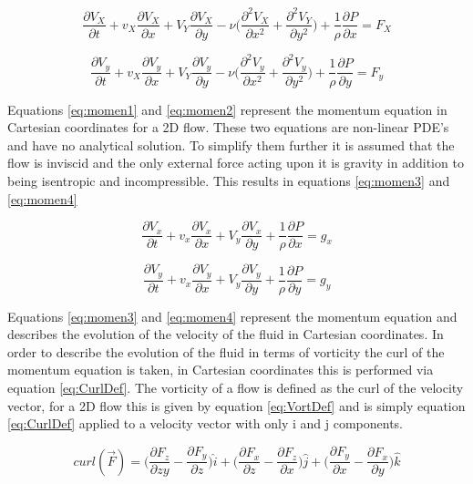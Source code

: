 \begin{equation}
\label{eq:momen1}
\frac{\partial V_X}{\partial t}+v_X \frac{\partial V_X}{\partial x}+V_Y \frac{\partial V_X}{\partial y}-\nu\big(\frac{\partial^2 V_X}{\partial x^2}+\frac{\partial^2 V_Y}{\partial y^2}\big)+\frac{1}{\rho}\frac{\partial P}{\partial x}=F_X
\end{equation}

\begin{equation}
\label{eq:momen2}
\frac{\partial V_y}{\partial t}+v_X \frac{\partial V_y}{\partial x}+V_Y \frac{\partial V_y}{\partial y}-\nu\big(\frac{\partial^2 V_y}{\partial x^2}+\frac{\partial^2 V_y}{\partial y^2}\big)+\frac{1}{\rho}\frac{\partial P}{\partial y}=F_y
\end{equation}

Equations \ref{eq:momen1} and \ref{eq:momen2} represent the momentum equation in Cartesian coordinates for a 2D flow. These two equations are non-linear PDE's and have no analytical solution. To simplify them further it is assumed that the flow is inviscid and the only external force acting upon it is gravity in addition to being isentropic and incompressible. This results in equations \ref{eq:momen3} and \ref{eq:momen4}

\begin{equation}
\label{eq:momen3}
\frac{\partial V_x}{\partial t}+v_x \frac{\partial V_x}{\partial x}+V_y \frac{\partial V_x}{\partial y}+\frac{1}{\rho}\frac{\partial P}{\partial x}=g_x
\end{equation}

\begin{equation}
\label{eq:momen4}
\frac{\partial V_y}{\partial t}+v_x \frac{\partial V_y}{\partial x}+V_y \frac{\partial V_y}{\partial y}+\frac{1}{\rho}\frac{\partial P}{\partial y}=g_y
\end{equation}

Equations \ref{eq:momen3} and \ref{eq:momen4} represent the momentum equation and describes the evolution of the velocity of the fluid in Cartesian coordinates. In order to describe the evolution of the fluid in terms of vorticity the curl of the momentum equation is taken, in Cartesian coordinates this is performed via equation \ref{eq:CurlDef}. The vorticity of a flow is defined as the curl of the velocity vector, for a 2D flow this is given by equation \ref{eq:VortDef} and is simply equation \ref{eq:CurlDef} applied to a velocity vector with only i and j components.

\begin{equation}
\label{eq:CurlDef}
curl(\vec{F})=\big(\frac{\partial F_z}{\partial zy}-\frac{\partial F_y}{\partial z}\big)\hat{i}+\big(\frac{\partial F_x}{\partial z}-\frac{\partial F_z}{\partial x}\big)\hat{j}+\big(\frac{\partial F_y}{\partial x}-\frac{\partial F_x}{\partial y}\big)\hat{k}
\end{equation}

